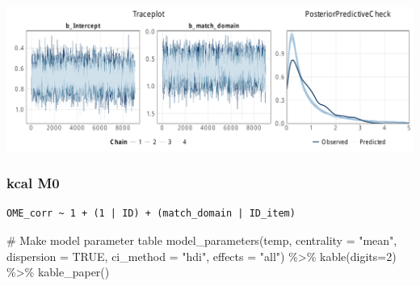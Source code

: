 \documentclass[
  letterpaper,
  DIV=11,
  numbers=noendperiod]{scrartcl}
\newenvironment{Shaded}{\begin{snugshade}}{\end{snugshade}}
\newcommand{\AttributeTok}[1]{\textcolor[rgb]{0.40,0.45,0.13}{#1}}
\newcommand{\CommentTok}[1]{\textcolor[rgb]{0.37,0.37,0.37}{#1}}
\newcommand{\ConstantTok}[1]{\textcolor[rgb]{0.56,0.35,0.01}{#1}}
\newcommand{\DecValTok}[1]{\textcolor[rgb]{0.68,0.00,0.00}{#1}}
\newcommand{\FunctionTok}[1]{\textcolor[rgb]{0.28,0.35,0.67}{#1}}
\newcommand{\NormalTok}[1]{\textcolor[rgb]{0.00,0.23,0.31}{#1}}
\newcommand{\OtherTok}[1]{\textcolor[rgb]{0.00,0.23,0.31}{#1}}
\newcommand{\SpecialCharTok}[1]{\textcolor[rgb]{0.37,0.37,0.37}{#1}}
\newcommand{\StringTok}[1]{\textcolor[rgb]{0.13,0.47,0.30}{#1}}
\begin{document}
\includegraphics{supplement_files/figure-pdf/h1aM1CO2-1.pdf}

\subsubsection{kcal M0}\label{kcal-m0}

\begin{Shaded}
\end{Shaded}

\begin{verbatim}
OME_corr ~ 1 + (1 | ID) + (match_domain | ID_item) 
\end{verbatim}

\begin{Shaded}
\begin{Highlighting}[]
\CommentTok{\# Make model parameter table}
\FunctionTok{model\_parameters}\NormalTok{(temp, }\AttributeTok{centrality =} \StringTok{"mean"}\NormalTok{, }\AttributeTok{dispersion =} \ConstantTok{TRUE}\NormalTok{, }
                 \AttributeTok{ci\_method =} \StringTok{"hdi"}\NormalTok{, }\AttributeTok{effects =} \StringTok{"all"}\NormalTok{) }\SpecialCharTok{\%\textgreater{}\%} 
  \FunctionTok{kable}\NormalTok{(}\AttributeTok{digits=}\DecValTok{2}\NormalTok{) }\SpecialCharTok{\%\textgreater{}\%} \FunctionTok{kable\_paper}\NormalTok{()}
\end{Highlighting}
\end{Shaded}
\end{document}
